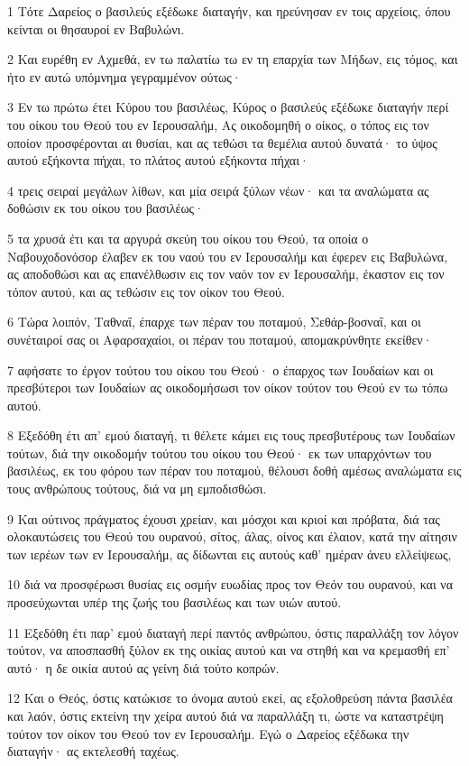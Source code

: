 \par 1 Τότε Δαρείος ο βασιλεύς εξέδωκε διαταγήν, και ηρεύνησαν εν τοις αρχείοις, όπου κείνται οι θησαυροί εν Βαβυλώνι.
\par 2 Και ευρέθη εν Αχμεθά, εν τω παλατίω τω εν τη επαρχία των Μήδων, εις τόμος, και ήτο εν αυτώ υπόμνημα γεγραμμένον ούτως·
\par 3 Εν τω πρώτω έτει Κύρου του βασιλέως, Κύρος ο βασιλεύς εξέδωκε διαταγήν περί του οίκου του Θεού του εν Ιερουσαλήμ, Ας οικοδομηθή ο οίκος, ο τόπος εις τον οποίον προσφέρονται αι θυσίαι, και ας τεθώσι τα θεμέλια αυτού δυνατά· το ύψος αυτού εξήκοντα πήχαι, το πλάτος αυτού εξήκοντα πήχαι·
\par 4 τρεις σειραί μεγάλων λίθων, και μία σειρά ξύλων νέων· και τα αναλώματα ας δοθώσιν εκ του οίκου του βασιλέως·
\par 5 τα χρυσά έτι και τα αργυρά σκεύη του οίκου του Θεού, τα οποία ο Ναβουχοδονόσορ έλαβεν εκ του ναού του εν Ιερουσαλήμ και έφερεν εις Βαβυλώνα, ας αποδοθώσι και ας επανέλθωσιν εις τον ναόν τον εν Ιερουσαλήμ, έκαστον εις τον τόπον αυτού, και ας τεθώσιν εις τον οίκον του Θεού.
\par 6 Τώρα λοιπόν, Ταθναΐ, έπαρχε των πέραν του ποταμού, Σεθάρ-βοσναΐ, και οι συνέταιροί σας οι Αφαρσαχαίοι, οι πέραν του ποταμού, απομακρύνθητε εκείθεν·
\par 7 αφήσατε το έργον τούτου του οίκου του Θεού· ο έπαρχος των Ιουδαίων και οι πρεσβύτεροι των Ιουδαίων ας οικοδομήσωσι τον οίκον τούτον του Θεού εν τω τόπω αυτού.
\par 8 Εξεδόθη έτι απ' εμού διαταγή, τι θέλετε κάμει εις τους πρεσβυτέρους των Ιουδαίων τούτων, διά την οικοδομήν τούτου του οίκου του Θεού· εκ των υπαρχόντων του βασιλέως, εκ του φόρου των πέραν του ποταμού, θέλουσι δοθή αμέσως αναλώματα εις τους ανθρώπους τούτους, διά να μη εμποδισθώσι.
\par 9 Και ούτινος πράγματος έχουσι χρείαν, και μόσχοι και κριοί και πρόβατα, διά τας ολοκαυτώσεις του Θεού του ουρανού, σίτος, άλας, οίνος και έλαιον, κατά την αίτησιν των ιερέων των εν Ιερουσαλήμ, ας δίδωνται εις αυτούς καθ' ημέραν άνευ ελλείψεως,
\par 10 διά να προσφέρωσι θυσίας εις οσμήν ευωδίας προς τον Θεόν του ουρανού, και να προσεύχωνται υπέρ της ζωής του βασιλέως και των υιών αυτού.
\par 11 Εξεδόθη έτι παρ' εμού διαταγή περί παντός ανθρώπου, όστις παραλλάξη τον λόγον τούτον, να αποσπασθή ξύλον εκ της οικίας αυτού και να στηθή και να κρεμασθή επ' αυτό· η δε οικία αυτού ας γείνη διά τούτο κοπρών.
\par 12 Και ο Θεός, όστις κατώκισε το όνομα αυτού εκεί, ας εξολοθρεύση πάντα βασιλέα και λαόν, όστις εκτείνη την χείρα αυτού διά να παραλλάξη τι, ώστε να καταστρέψη τούτον τον οίκον του Θεού τον εν Ιερουσαλήμ. Εγώ ο Δαρείος εξέδωκα την διαταγήν· ας εκτελεσθή ταχέως.
